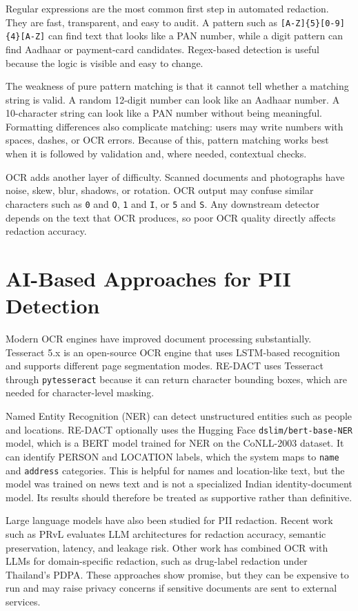 Regular expressions are the most common first step in automated redaction. They are fast, transparent, and easy to audit. A pattern such as \texttt{[A-Z]\{5\}[0-9]\{4\}[A-Z]} can find text that looks like a PAN number, while a digit pattern can find Aadhaar or payment-card candidates. Regex-based detection is useful because the logic is visible and easy to change.

The weakness of pure pattern matching is that it cannot tell whether a matching string is valid. A random 12-digit number can look like an Aadhaar number. A 10-character string can look like a PAN number without being meaningful. Formatting differences also complicate matching: users may write numbers with spaces, dashes, or OCR errors. Because of this, pattern matching works best when it is followed by validation and, where needed, contextual checks.

OCR adds another layer of difficulty. Scanned documents and photographs have noise, skew, blur, shadows, or rotation. OCR output may confuse similar characters such as \texttt{0} and \texttt{O}, \texttt{1} and \texttt{I}, or \texttt{5} and \texttt{S}. Any downstream detector depends on the text that OCR produces, so poor OCR quality directly affects redaction accuracy.

\section{AI-Based Approaches for PII Detection}

Modern OCR engines have improved document processing substantially. Tesseract 5.x is an open-source OCR engine that uses LSTM-based recognition and supports different page segmentation modes. RE-DACT uses Tesseract through \texttt{pytesseract} because it can return character bounding boxes, which are needed for character-level masking.

Named Entity Recognition (NER) can detect unstructured entities such as people and locations. RE-DACT optionally uses the Hugging Face \texttt{dslim/bert-base-NER} model, which is a BERT model trained for NER on the CoNLL-2003 dataset. It can identify PERSON and LOCATION labels, which the system maps to \texttt{name} and \texttt{address} categories. This is helpful for names and location-like text, but the model was trained on news text and is not a specialized Indian identity-document model. Its results should therefore be treated as supportive rather than definitive.

Large language models have also been studied for PII redaction. Recent work such as PRvL evaluates LLM architectures for redaction accuracy, semantic preservation, latency, and leakage risk. Other work has combined OCR with LLMs for domain-specific redaction, such as drug-label redaction under Thailand's PDPA. These approaches show promise, but they can be expensive to run and may raise privacy concerns if sensitive documents are sent to external services.

